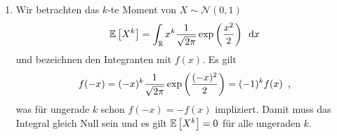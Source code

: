 \documentclass[ngerman, a4paper, 11pt]{article}
\theoremstyle{plain}
\theoremstyle{plain}
\theoremstyle{proofstyle}
\newcommand{\komma}{\enskip \text{,}}
\begin{document}
\begin{exercisePage}
\begin{enumerate}[label=(\alph*), leftmargin=*]
	\pagebreak
	
	\item 
	
	Wir betrachten das $k$-te Moment von $X \sim \mathcal{N}(0,1)$
	\begin{equation*}
		\mathbb{E} \left[ X^k \right] = \int_{\mathbb{R}} x^k \frac{1}{\sqrt{2\pi}} \exp\left( \frac{x^2}{2} \right) \enskip \mathrm{d}x
	\end{equation*}
	und bezeichnen den Integranten mit $f(x)$. Es gilt 
	\begin{equation*}
		f(-x) = (-x)^k \frac{1}{\sqrt{2\pi}} \exp\brackets{\frac{(-x)^2}{2}} = (-1)^k f(x) \komma
	\end{equation*}
	was für ungerade $k$ schon $f(-x) = -f(x)$ impliziert. Damit muss das Integral gleich Null sein und es gilt $\mathbb{E} \left[ X^k \right] = 0$ für alle ungeraden $k$.	
	\end{enumerate}

\end{exercisePage}
\end{document}
